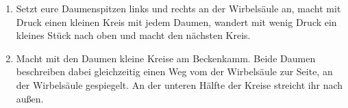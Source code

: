 \begin{enumerate}
  \item {} Setzt eure Daumenspitzen links und rechts an der Wirbelsäule an, macht mit Druck einen kleinen Kreis mit jedem Daumen, wandert mit wenig Druck ein kleines Stück nach oben und macht den nächsten Kreis.
  \iftoggle{long}{
    \item \fett{Daumenstreichungen am Illiosakralgelenk:} Streicht etwas oberhalb des Illiosakralgelenks (also oberhalb der Stelle, wo die Wirbelsäule den Beckenknochen berührt) fächerförmig mit den Daumenspitzen schräg nach außen/oben.
  }{}
  \item {} Macht mit den Daumen kleine Kreise am Beckenkamm. Beide Daumen beschreiben dabei gleichzeitig einen Weg vom der Wirbelsäule zur Seite, an der Wirbelsäule gespiegelt. An der unteren Hälfte der Kreise streicht ihr nach außen.
  \iftoggle{long}{
    \item \fett{Bahnen mit aufgestellten Fingern:} Formt mit offenen Fingern Tigerkrallen und streicht mit den Fingerspitzen der aufgestellten, angespannten Finger kräftig von der Hüfte in Richtung Kopf.
  }{}
\end{enumerate}
\pagebreak


